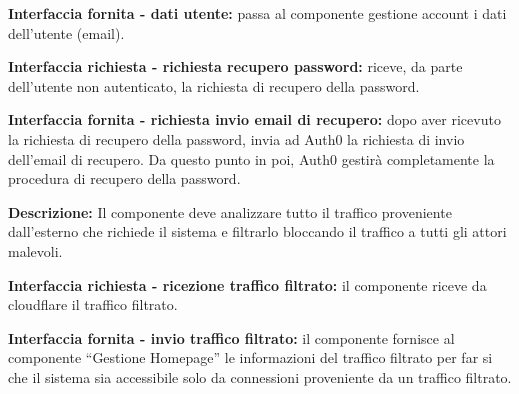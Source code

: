 \begin{listaPersonale}[DCI]{}
    \textbf{Interfaccia fornita - dati utente:} passa al componente gestione account i dati dell'utente (email).

    \textbf{Interfaccia richiesta - richiesta recupero password:} riceve, da parte dell'utente non autenticato, la richiesta di recupero della password.

    \textbf{Interfaccia fornita - richiesta invio email di recupero:} dopo aver ricevuto la richiesta di recupero della password, invia ad Auth0 la richiesta di invio dell'email di recupero. Da questo punto in poi, Auth0 gestirà completamente la procedura di recupero della password.



    \textbf{Descrizione:} Il componente deve analizzare tutto il traffico proveniente dall'esterno che richiede il sistema e filtrarlo bloccando il traffico a tutti gli attori malevoli.

    \textbf{Interfaccia richiesta - ricezione traffico filtrato:} il componente riceve da cloudflare il traffico filtrato.

    \textbf{Interfaccia fornita - invio traffico filtrato:} il componente fornisce al componente “Gestione Homepage” le informazioni del traffico filtrato per far si che il sistema sia accessibile solo da connessioni proveniente da un traffico filtrato.

\end{listaPersonale}